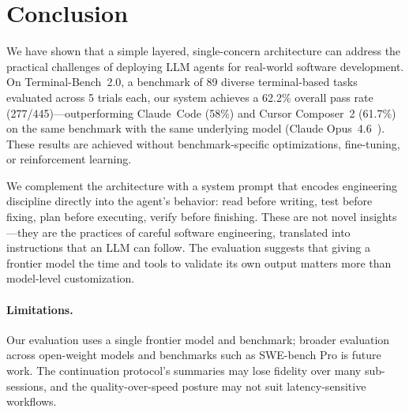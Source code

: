 \documentclass{article}
\begin{document}
\section{Conclusion}
\label{sec:conclusion}

We have shown that a simple layered, single-concern architecture can address the practical challenges of deploying LLM agents for real-world software development.  On Terminal-Bench~2.0, a benchmark of 89 diverse terminal-based tasks evaluated across 5 trials each, our system achieves a 62.2\% overall pass rate (277/445)---outperforming Claude~Code (58\%) and Cursor Composer~2 (61.7\%) on the same benchmark with the same underlying model (Claude Opus~4.6~\citep{anthropic2026opus46}).  These results are achieved without benchmark-specific optimizations, fine-tuning, or reinforcement learning.

We complement the architecture with a system prompt that encodes engineering discipline directly into the agent's behavior: read before writing, test before fixing, plan before executing, verify before finishing.  These are not novel insights---they are the practices of careful software engineering, translated into instructions that an LLM can follow.  The evaluation suggests that giving a frontier model the time and tools to validate its own output matters more than model-level customization.

\paragraph{Limitations.}  Our evaluation uses a single frontier model and benchmark; broader evaluation across open-weight models and benchmarks such as SWE-bench Pro is future work.  The continuation protocol's summaries may lose fidelity over many sub-sessions, and the quality-over-speed posture may not suit latency-sensitive workflows.


{\small


}

\appendix
\end{document}
